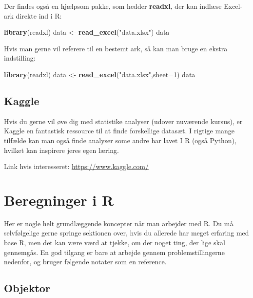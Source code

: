 \documentclass[
]{book}
\newenvironment{Shaded}{\begin{snugshade}}{\end{snugshade}}
\newcommand{\AttributeTok}[1]{\textcolor[rgb]{0.13,0.29,0.53}{#1}}
\newcommand{\DecValTok}[1]{\textcolor[rgb]{0.00,0.00,0.81}{#1}}
\newcommand{\FunctionTok}[1]{\textcolor[rgb]{0.13,0.29,0.53}{\textbf{#1}}}
\newcommand{\NormalTok}[1]{#1}
\newcommand{\OtherTok}[1]{\textcolor[rgb]{0.56,0.35,0.01}{#1}}
\newcommand{\StringTok}[1]{\textcolor[rgb]{0.31,0.60,0.02}{#1}}
\begin{document}
Der findes også en hjælpsom pakke, som hedder \textbf{readxl}, der kan indlæse Excel-ark direkte ind i R:

\begin{Shaded}
\begin{Highlighting}[]
\FunctionTok{library}\NormalTok{(readxl)}
\NormalTok{data }\OtherTok{\textless{}{-}} \FunctionTok{read\_excel}\NormalTok{(}\StringTok{"data.xlsx"}\NormalTok{)}
\NormalTok{data}
\end{Highlighting}
\end{Shaded}

Hvis man gerne vil referere til en bestemt ark, så kan man bruge en ekstra indstilling:

\begin{Shaded}
\begin{Highlighting}[]
\FunctionTok{library}\NormalTok{(readxl)}
\NormalTok{data }\OtherTok{\textless{}{-}} \FunctionTok{read\_excel}\NormalTok{(}\StringTok{"data.xlsx"}\NormalTok{,}\AttributeTok{sheet=}\DecValTok{1}\NormalTok{)}
\NormalTok{data}
\end{Highlighting}
\end{Shaded}

\subsection{Kaggle}\label{kaggle}

Hvis du gerne vil øve dig med statistike analyser (udover nuværende kursus), er Kaggle en fantastisk ressource til at finde forskellige datasæt. I rigtige mange tilfælde kan man også finde analyser some andre har lavet I R (også Python), hvilket kan inspirere jeres egen læring.

Link hvis interesseret: \url{https://www.kaggle.com/}

\section{Beregninger i R}\label{beregninger-i-r}

Her er nogle helt grundlæggende koncepter når man arbejder med R. Du må selvfølgelige gerne springe sektionen over, hvis du allerede har meget erfaring med base R, men det kan være værd at tjekke, om der noget ting, der lige skal gennemgås. En god tilgang er bare at arbejde gennem problemstillingerne nedenfor, og bruger følgende notater som en reference.

\subsection{Objektor}\label{objektor}
\end{document}
